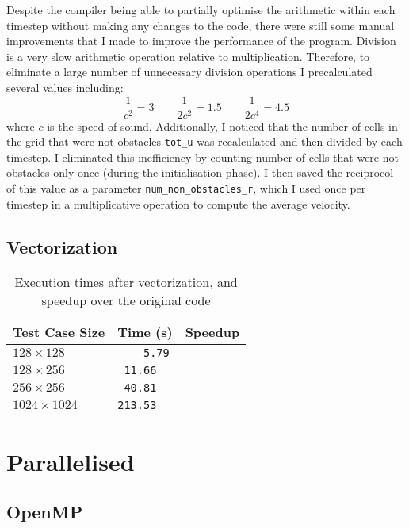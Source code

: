 \documentclass[11pt, twocolumn, a4paper]{article}
\begin{document}
Despite the compiler being able to partially optimise the arithmetic within each timestep without making any changes to the code, there were still some manual improvements that I made to improve the performance of the program.
Division is a very slow arithmetic operation relative to multiplication.
Therefore, to eliminate a large number of unnecessary division operations I precalculated several values including:
\[
    \frac{1}{c^2} = 3\qquad
    \frac{1}{2c^2} = 1.5\qquad
    \frac{1}{2c^4} = 4.5
\]
where $c$ is the speed of sound.
Additionally, I noticed that the number of cells in the grid that were not obstacles \texttt{tot\_u} was recalculated and then divided by each timestep.
I eliminated this inefficiency by counting number of cells that were not obstacles only once (during the initialisation phase).
I then saved the reciprocol of this value as a parameter \texttt{num\_non\_obstacles\_r}, which I used once per timestep in a multiplicative operation to compute the average velocity.

\subsection{Vectorization}

\begin{table}[htbp]
    \begin{center}
    \caption{Execution times after vectorization, and speedup over the original code}\label{tab:vectorized}
    \begin{tabular}{l | l l} 
        \hline\hline
        Test Case Size&Time (s)&Speedup\\
        \hline
        $128 \times 128$&\texttt{  \,\,\,5.79}\\
        $128 \times 256$&\texttt{ 11.66}\\
        $256 \times 256$&\texttt{ 40.81}\\
        $1024 \times 1024$&\texttt{213.53}\\
        \hline
      \end{tabular}
    \end{center}
\end{table} 

\section{Parallelised}

\subsection{OpenMP}
\end{document}
